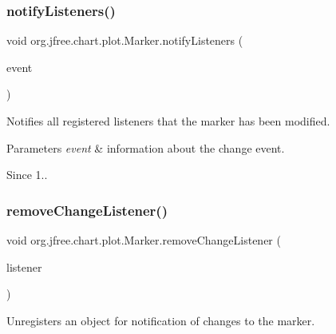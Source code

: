 \subsubsection{\texorpdfstring{notify\+Listeners()}{notifyListeners()}}
{\footnotesize\ttfamily void org.\+jfree.\+chart.\+plot.\+Marker.\+notify\+Listeners (\begin{DoxyParamCaption}\item[{\mbox{\hyperlink{classorg_1_1jfree_1_1chart_1_1event_1_1_marker_change_event}{Marker\+Change\+Event}}}]{event }\end{DoxyParamCaption})}

Notifies all registered listeners that the marker has been modified.


\begin{DoxyParams}{Parameters}
{\em event} & information about the change event.\\
\hline
\end{DoxyParams}
\begin{DoxySince}{Since}
1.. 
\end{DoxySince}
\mbox{\label{classorg_1_1jfree_1_1chart_1_1plot_1_1_marker_a72e865426bd73ef0496079561882a93f}} 
\subsubsection{\texorpdfstring{remove\+Change\+Listener()}{removeChangeListener()}}
{\footnotesize\ttfamily void org.\+jfree.\+chart.\+plot.\+Marker.\+remove\+Change\+Listener (\begin{DoxyParamCaption}\item[{\mbox{\hyperlink{interfaceorg_1_1jfree_1_1chart_1_1event_1_1_marker_change_listener}{Marker\+Change\+Listener}}}]{listener }\end{DoxyParamCaption})}

Unregisters an object for notification of changes to the marker.


